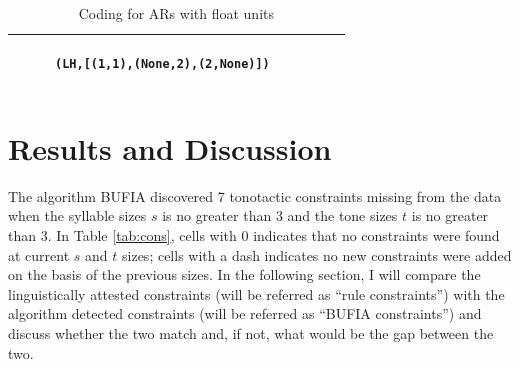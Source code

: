 \documentclass[11pt,letterpaper]{article}
\begin{document}
\begin{table}[H]
\begin{tabular}{ c|c|c}
\begin{subfigure}{0.33\textwidth}
		\caption{\texttt{(LH,[(1,1),(None,2),(2,None)])}}
		\label{floatsyl}			
	\end{subfigure} \\
\hline
\end{tabular}
\caption{Coding for ARs with float units}
\label{tab:float}
\end{table}


\section{Results and Discussion}

The algorithm BUFIA discovered 7 tonotactic constraints missing from the data when the syllable sizes $s$ is no greater than 3 and the tone sizes $t$ is no greater than 3. In Table \ref{tab:cons}, cells with 0 indicates that no constraints were found at current $s$ and $t$ sizes; cells with a dash indicates no new constraints were added on the basis of the previous sizes. In the following section, I will compare the linguistically attested constraints (will be referred as ``rule constraints'') with the algorithm detected constraints (will be referred as ``BUFIA constraints'') and discuss whether the two match and, if not, what would be the gap between the two.
\end{document}
